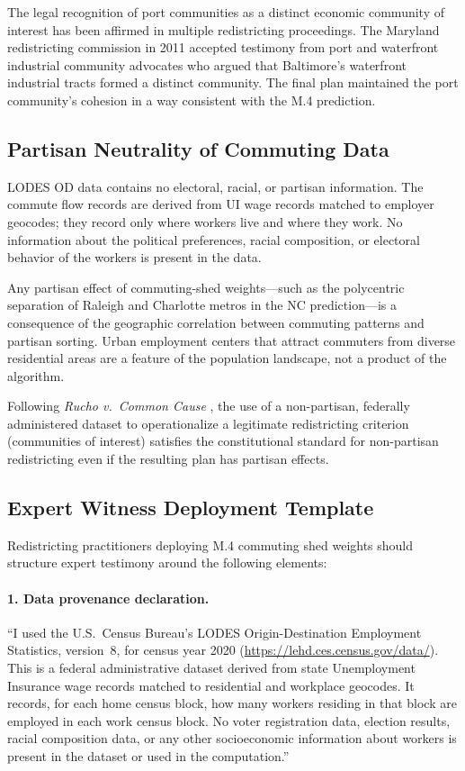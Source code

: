 The legal recognition of port communities as a distinct economic community of
interest has been affirmed in multiple redistricting proceedings.
The Maryland redistricting commission in 2011 accepted testimony from port
and waterfront industrial community advocates who argued that Baltimore's
waterfront industrial tracts formed a distinct community.
The final plan maintained the port community's cohesion in a way consistent
with the M.4 prediction.

\subsection{Partisan Neutrality of Commuting Data}

LODES OD data contains no electoral, racial, or partisan information.
The commute flow records are derived from UI wage records matched to
employer geocodes; they record only where workers live and where they work.
No information about the political preferences, racial composition, or
electoral behavior of the workers is present in the data.

Any partisan effect of commuting-shed weights---such as the polycentric
separation of Raleigh and Charlotte metros in the NC prediction---is a
consequence of the geographic correlation between commuting patterns and
partisan sorting.
Urban employment centers that attract commuters from diverse residential areas
are a feature of the population landscape, not a product of the algorithm.

Following \textit{Rucho v.\ Common Cause} \citeyearpar{rucho2019}, the use
of a non-partisan, federally administered dataset to operationalize a
legitimate redistricting criterion (communities of interest) satisfies the
constitutional standard for non-partisan redistricting even if the resulting
plan has partisan effects.

\subsection{Expert Witness Deployment Template}

Redistricting practitioners deploying M.4 commuting shed weights should
structure expert testimony around the following elements:

\paragraph{1. Data provenance declaration.}
``I used the U.S.\ Census Bureau's LODES Origin-Destination Employment
Statistics, version~8, for census year 2020
(\url{https://lehd.ces.census.gov/data/}).
This is a federal administrative dataset derived from state Unemployment
Insurance wage records matched to residential and workplace geocodes.
It records, for each home census block, how many workers residing in
that block are employed in each work census block.
No voter registration data, election results, racial composition data,
or any other socioeconomic information about workers is present in the
dataset or used in the computation.''

